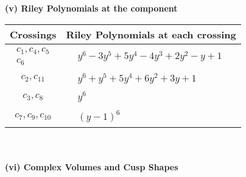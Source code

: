 \documentclass[1p]{elsarticle_modified}
\theoremstyle{definition}
\begin{document}
\newpage\renewcommand{\arraystretch}{1}
\flushleft \textbf{(v) Riley Polynomials at the component}\newline \\
\begin{tabular}{m{50pt}|m{274pt}}
Crossings & \hspace{64pt}Riley Polynomials at each crossing \\
\hline $$\begin{aligned}c_{1},c_{4},c_{5}\\c_{6}\end{aligned}$$&$\begin{aligned}
&y^6-3 y^5+5 y^4-4 y^3+2 y^2- y+1
\end{aligned}$\\
\hline $$\begin{aligned}c_{2},c_{11}\end{aligned}$$&$\begin{aligned}
&y^6+y^5+5 y^4+6 y^2+3 y+1
\end{aligned}$\\
\hline $$\begin{aligned}c_{3},c_{8}\end{aligned}$$&$\begin{aligned}
&y^6
\end{aligned}$\\
\hline $$\begin{aligned}c_{7},c_{9},c_{10}\end{aligned}$$&$\begin{aligned}
&(y-1)^6
\end{aligned}$\\
\hline
\end{tabular}\\~\\
\newpage\flushleft \textbf{(vi) Complex Volumes and Cusp Shapes}
\end{document}
